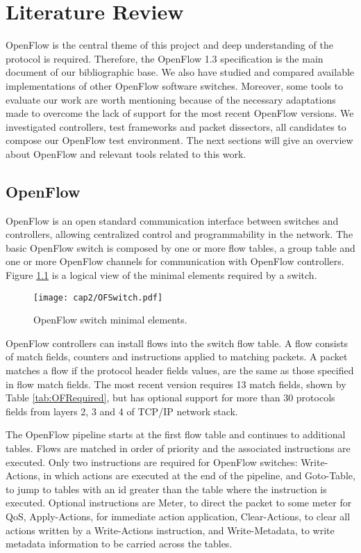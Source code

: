 \chapter{Literature Review}
\label{cap:cap02}

OpenFlow is the central theme of this project and deep understanding of the protocol is required. Therefore, the OpenFlow 1.3 specification \cite{ofspec13} is the main document of our bibliographic base. We also have studied and compared available implementations of other OpenFlow software switches. Moreover, some tools to evaluate our work are worth mentioning because of the necessary adaptations made to overcome the lack of support for the most recent OpenFlow versions. We investigated controllers, test frameworks and packet dissectors, all candidates to compose our OpenFlow test environment. The next sections will give an overview about OpenFlow and relevant tools related to this work. 

\section{OpenFlow}
\label{sec:sec21}

OpenFlow is an open standard communication interface between switches and controllers, allowing centralized control and programmability in the network. The basic OpenFlow switch is composed by one or more flow tables, a group table and one or more OpenFlow channels for communication with OpenFlow controllers. Figure \ref{fig:logicalswitch} is a logical view of the minimal elements required by a switch. 

\begin{figure}[h!]
\centering
\texttt{[image: cap2/OFSwitch.pdf]}
\caption{OpenFlow switch minimal elements.}
\label{fig:logicalswitch}
\end{figure}
\pagebreak

OpenFlow controllers can install flows into the switch flow table. A flow consists of match fields, counters and instructions applied to matching packets. A packet matches a flow if the protocol header fields values, are the same as those specified in flow match fields. The most recent version requires 13 match fields, shown by Table \ref{tab:OFRequired}, but has optional support for more than 30 protocols fields from layers 2, 3 and 4 of TCP/IP network stack.

The OpenFlow pipeline starts at the first flow table and continues to additional tables. Flows are matched in order of priority and the associated instructions are executed. Only two instructions are required for OpenFlow switches: Write-Actions, in which actions are executed at the end of the pipeline, and Goto-Table, to jump to tables with an id greater than the table where the instruction is executed. Optional instructions are Meter, to direct the packet to some meter for QoS, Apply-Actions, for immediate action application, Clear-Actions, to clear all actions written by a Write-Actions instruction, and Write-Metadata, to write metadata information to be carried across the tables. 

